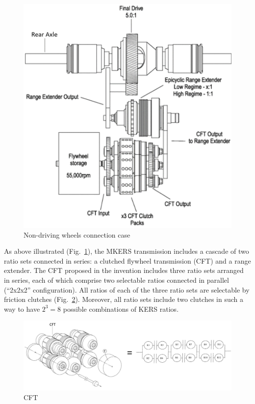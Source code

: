 \documentclass[11pt]{article}
\begin{document}
\begin{figure}[H]
\centering
\includegraphics[width=.6\textwidth]{Images/State_of_the_art/Patent2}
\caption{Non-driving wheels connection case}
\label{Patent2}
\end{figure}

As above illustrated (Fig.~\ref{Patent2}), the MKERS transmission includes a cascade of two ratio sets connected in series: a clutched flywheel transmission (CFT) and a range extender. The CFT proposed in the invention includes three ratio sets arranged in series, each of which comprise two selectable ratios connected in parallel (“2x2x2” configuration). All ratios of each of the three ratio sets are selectable by friction clutches (Fig.~\ref{Patent3}). Moreover, all ratio sets include two clutches in such a way to have $2^{3}=8$ possible combinations of KERS ratios.

\begin{figure}[H]
\centering
\includegraphics[width=.9\textwidth]{Images/State_of_the_art/Patent3}
\caption{CFT}
\label{Patent3}
\end{figure}
\end{document}
